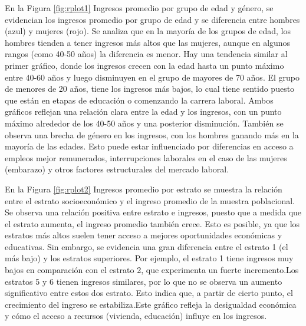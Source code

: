 \documentclass[12pt,a4paper,onecolumn]{article}
\begin{document}
\begin{enumerate}
\begin{enumerate}
En la Figura \ref{fig:rplot1} Ingresos promedio por grupo de edad y g\'enero, se evidencian los ingresos promedio por grupo de edad y se diferencia entre hombres (azul) y mujeres (rojo). Se analiza que en la mayor\'ia de los grupos de edad, los hombres tienden a tener ingresos m\'as altos que las mujeres, aunque en algunos rangos (como 40-50 a\~nos) la diferencia es menor. Hay una tendencia similar al primer gr\'afico, donde los ingresos crecen con la edad hasta un punto m\'aximo entre 40-60 a\~nos y luego disminuyen en el grupo de mayores de 70 a\~nos. El grupo de menores de 20 a\~nos, tiene los ingresos m\'as bajos, lo cual tiene sentido puesto que est\'an en etapas de educaci\'on o comenzando la carrera laboral. Ambos gr\'aficos reflejan una relaci\'on clara entre la edad y los ingresos, con un punto m\'aximo alrededor de los 40-50 a\~nos y una posterior disminuci\'on. Tambi\'en se observa una brecha de g\'enero en los ingresos, con los hombres ganando m\'as en la mayor\'ia de las edades. Esto puede estar influenciado por diferencias en acceso a empleos mejor remunerados, interrupciones laborales en el caso de las mujeres (embarazo) y otros factores estructurales del mercado laboral. 

En la Figura \ref{fig:rplot2} Ingresos promedio por estrato se muestra la relaci\'on entre el estrato socioecon\'omico y el ingreso promedio de la muestra poblacional. Se observa una relaci\'on positiva entre estrato e ingresos, puesto que a medida que el estrato aumenta, el ingreso promedio tambi\'en crece. Esto es posible, ya que los estratos m\'as altos suelen tener acceso a mejores oportunidades econ\'omicas y educativas. Sin embargo, se evidencia una gran diferencia entre el estrato 1 (el m\'as bajo) y los estratos superiores. Por ejemplo, el estrato 1 tiene ingresos muy bajos en comparaci\'on con el estrato 2, que experimenta un fuerte incremento.Los estratos 5 y 6 tienen ingresos similares, por lo que no se observa un aumento significativo entre estos dos estrato. Esto indica que, a partir de cierto punto, el crecimiento del ingreso se estabiliza.Este gr\'afico refleja la desigualdad econ\'omica y c\'omo el acceso a recursos (vivienda, educaci\'on) influye en los ingresos. 


\end{enumerate}
\end{enumerate}
\end{document}
